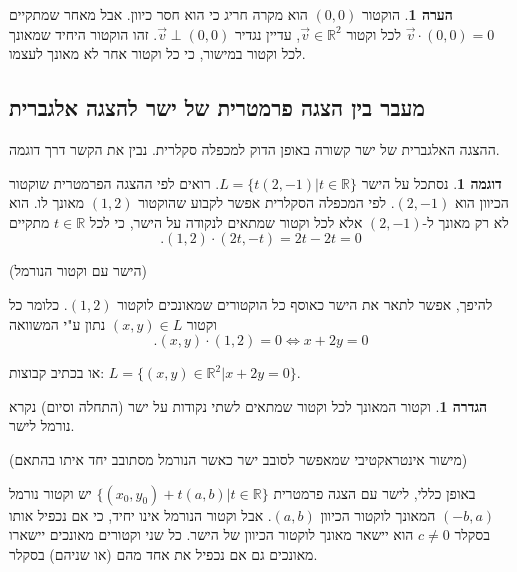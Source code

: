 \documentclass[12pt]{book}
\theoremstyle{plain}
\theoremstyle{definition}
\newtheorem{definition}[theorem]{הגדרה}
\newtheorem{example}[theorem]{דוגמה}
\newtheorem{remark}[theorem]{הערה}
\newcommand{\R}{\mathbb{R}}
\begin{document}
\begin{remark}
הוקטור \((0,0)\) הוא מקרה חריג כי הוא חסר כיוון. אבל מאחר
שמתקיים \(\vec{v}\cdot(0,0)=0\) לכל וקטור \(\vec{v}\in\R^2\),
עדיין נגדיר \(\vec{v}\perp(0,0)\). זהו הוקטור היחיד שמאונך לכל
וקטור במישור, כי כל וקטור אחר לא מאונך לעצמו.
\end{remark}

\subsection{מעבר בין הצגה פרמטרית של ישר להצגה אלגברית}

ההצגה האלגברית של ישר קשורה באופן הדוק למכפלה סקלרית. נבין את הקשר
דרך דוגמה.

\begin{example}
נסתכל על הישר \(L=\{t(2,-1)|t\in\mathbb{R}\}\). רואים לפי
ההצגה הפרמטרית שוקטור הכיוון הוא \((2,-1)\). לפי המכפלה הסקלרית
אפשר לקבוע שהוקטור \((1,2)\) מאונך לו. הוא לא רק מאונך ל-\((2,-1)\)
אלא לכל וקטור שמתאים לנקודה על הישר, כי לכל \(t\in\R\)
מתקיים
\begin{equation*}
	.(1,2)\cdot(2t,-t)=2t-2t=0
\end{equation*}
\end{example}

\begin{center}
	(הישר עם וקטור הנורמל)
\end{center}

להיפך, אפשר לתאר את הישר כאוסף כל הוקטורים שמאונכים לוקטור \((1,2)\).
כלומר כל וקטור \((x,y)\in L\) נתון ע"י המשוואה
\begin{equation*}
	.(x,y)\cdot(1,2)=0\iff x+2y=0
\end{equation*}

או בכתיב קבוצות: \(L=\{(x,y)\in\mathbb{R}^{2}|x+2y=0\}\).

\begin{definition}
וקטור המאונך לכל וקטור שמתאים לשתי נקודות על ישר (התחלה וסיום)
נקרא נורמל לישר.
\end{definition}

\begin{center}
(מישור אינטראקטיבי שמאפשר לסובב ישר כאשר הנורמל מסתובב יחד איתו בהתאם)
\end{center}

באופן כללי, לישר עם הצגה פרמטרית \(\{(x_{0},y_{0})+t(a,b)|t\in\R\}\)
יש וקטור נורמל \((-b,a)\) המאונך לוקטור הכיוון \((a,b)\). אבל
וקטור הנורמל אינו יחיד, כי אם נכפיל אותו בסקלר \(c\neq0\) הוא יישאר
מאונך לוקטור הכיוון של הישר. כל שני וקטורים מאונכים יישארו מאונכים
גם אם נכפיל את אחד מהם (או שניהם) בסקלר.
\end{document}
